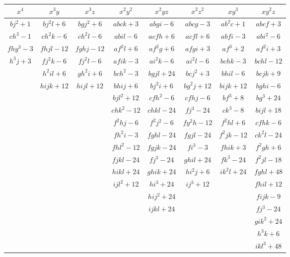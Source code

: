\documentclass[11pt,a4paper]{book}
\begin{document}
\begin{center}
\begin{center}
\small
\begin{tabular}{|c|c|c|c|c|c|c|c|}
\hline
$x^4$ & $x^3y$ & $x^3z$ & $x^2y^2$ & $x^2yz$ & $x^2z^2$ & $xy^3$ & $xy^2z$ \\
\hline
$bj^2 + 1$ & $bj^2l + 6$ & $bgj^2 + 6$ & $abck + 3$ & $abgi - 6$ & $abcg - 3$ & $ab^2c + 1$ & $abcf + 3$ \\
$ch^3 - 1$ & $ch^2k - 6$ & $ch^2l - 6$ & $abil - 6$ & $acfh + 6$ & $acfl + 6$ & $abfi - 3$ & $abi^2 - 6$ \\
$fhy^3 - 3$ & $fhjl - 12$ & $fghj - 12$ & $af^2l + 6$ & $af^2g + 6$ & $afgi + 3$ & $af^3 + 2$ & $af^2i + 3$ \\
$h^3j + 3$ & $fj^2k - 6$ & $fj^2l - 6$ & $afik - 3$ & $ai^2k - 6$ & $ai^2l - 6$ & $bchk - 3$ & $bchl - 12$ \\
& $h^2il + 6$ & $gh^2i + 6$ & $bch^2 - 3$ & $bgjl + 24$ & $bcj^2 + 3$ & $bhil - 6$ & $bcjk + 9$ \\
& $hijk + 12$ & $hijl + 12$ & $bhij + 6$ & $bj^2i + 6$ & $bg^2j + 12$ & $bijk + 12$ & $bghi - 6$ \\
& & & $bjl^2 + 12$ & $cfh^2 - 6$ & $cfhj - 6$ & $bf^3 + 8$ & $bg^3 + 24$ \\
& & & $chk^2 - 12$ & $chkl - 24$ & $fj^3 - 24$ & $ck^3 - 8$ & $bijl + 18$ \\
& & & $f^2hj - 6$ & $f^2j^2 - 6$ & $fy^2h - 12$ & $f^2hl + 6$ & $cfhk - 6$ \\
& & & $fh^2i - 3$ & $fghl - 24$ & $fgjl - 24$ & $f^2jk - 12$ & $ck^2l - 24$ \\
& & & $fhl^2 - 12$ & $fgjk - 24$ & $fi^3 - 3$ & $fhik + 3$ & $f^2gh + 6$ \\
& & & $fjkl - 24$ & $fj^3 - 24$ & $ghil + 24$ & $fk^3 - 24$ & $f^2jl - 18$ \\
& & & $hikl + 24$ & $ghik + 24$ & $hi^2j + 6$ & $ik^2l + 24$ & $fghl + 48$ \\
& & & $ijl^2 + 12$ & $hi^3 + 24$ & $ij^3 + 12$ & & $fhil + 12$ \\
& & & & $hij^2 + 24$ & & & $fijk - 9$ \\
& & & & $ijkl + 24$ & & & $fj^3 - 24$ \\
& & & & & & & $gik^2 + 24$ \\
& & & & & & & $h^3k + 6$ \\
& & & & & & & $ikl^3 + 48$ \\
\hline
\end{tabular}
\end{center}


\end{center}
\end{document}
